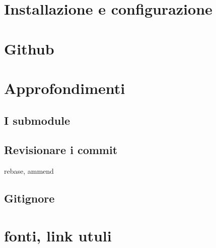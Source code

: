 \documentclass{article} \usepackage[textwidth=18cm,textheight=18cm]{geometry}
\begin{document}
\section{Installazione e configurazione}

\section{Github}

\section{Approfondimenti}

\subsection{I submodule}

\subsection{Revisionare i commit}

rebase, ammend

\subsection{Gitignore}

\section{fonti, link utuli}
\end{document}
